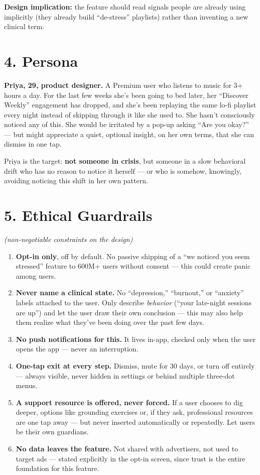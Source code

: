 \documentclass[11pt,a4paper]{article}
\begin{document}
\noindent\textbf{Design implication:} the feature should read signals people are already using implicitly (they already build ``de-stress'' playlists) rather than inventing a new clinical term.

\section*{4. Persona}
\textbf{Priya, 29, product designer.}
A Premium user who listens to music for 3+ hours a day. For the last few weeks she's been going to bed later, her ``Discover Weekly'' engagement has dropped, and she's been replaying the same lo-fi playlist every night instead of skipping through it like she used to. She hasn't consciously noticed any of this. She would be irritated by a pop-up asking ``Are you okay?'' --- but might appreciate a quiet, optional insight, on her own terms, that she can dismiss in one tap.

Priya is the target: \textbf{not someone in crisis}, but someone in a slow behavioral drift who has no reason to notice it herself --- or who is somehow, knowingly, avoiding noticing this shift in her own pattern.

\section*{5. Ethical Guardrails}
\emph{(non-negotiable constraints on the design)}

\begin{enumerate}[leftmargin=1.6em]
  \item \textbf{Opt-in only}, off by default. No passive shipping of a ``we noticed you seem stressed'' feature to 600M+ users without consent --- this could create panic among users.
  \item \textbf{Never name a clinical state.} No ``depression,'' ``burnout,'' or ``anxiety'' labels attached to the user. Only describe \emph{behavior} (``your late-night sessions are up'') and let the user draw their own conclusion --- this may also help them realize what they've been doing over the past few days.
  \item \textbf{No push notifications for this.} It lives in-app, checked only when the user opens the app --- never an interruption.
  \item \textbf{One-tap exit at every step.} Dismiss, mute for 30 days, or turn off entirely --- always visible, never hidden in settings or behind multiple three-dot menus.
  \item \textbf{A support resource is offered, never forced.} If a user chooses to dig deeper, options like grounding exercises or, if they ask, professional resources are one tap away --- but never inserted automatically or repeatedly. Let users be their own guardians.
  \item \textbf{No data leaves the feature.} Not shared with advertisers, not used to target ads --- stated explicitly in the opt-in screen, since trust is the entire foundation for this feature.
\end{enumerate}
\end{document}
